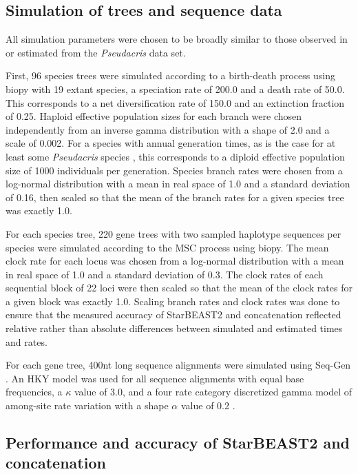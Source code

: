 \documentclass[nogrid]{MBE}%
\begin{document}
\subsection{Simulation of trees and sequence data}

All simulation parameters were chosen to be broadly similar to those observed in
or estimated from the \textit{Pseudacris} data set.

First, 96 species trees were simulated according to a birth-death process
\citep{Gernhard2008769} using biopy with 19 extant species, a speciation rate of
200.0 and a death rate of 50.0. This corresponds to a net diversification rate
of 150.0 and an extinction fraction of 0.25. Haploid effective population sizes
for each branch were chosen independently from an inverse gamma distribution
with a shape of 2.0 and a scale of 0.002. For a species with annual generation
times, as is the case for at least some \textit{Pseudacris} species
\citep{10.2307/1446044}, this corresponds to a diploid effective population size
of 1000 individuals per generation. Species branch rates were chosen from a
log-normal distribution with a mean in real space of 1.0 and a standard
deviation of 0.16, then scaled so that the mean of the branch rates for a given
species tree was exactly 1.0.

For each species tree, 220 gene trees with two sampled haplotype sequences per species
were simulated according to the MSC process using biopy. The
mean clock rate for each locus was chosen from a log-normal distribution with a
mean in real space of 1.0 and a standard deviation of 0.3. The clock rates of
each sequential block of 22 loci were then scaled so that the mean of the clock
rates for a given block was exactly 1.0. Scaling branch rates and clock rates
was done to ensure that the measured accuracy of StarBEAST2 and concatenation reflected
relative rather than absolute differences between simulated and estimated times
and rates.

For each gene tree, 400nt long sequence alignments were simulated using Seq-Gen
\citep{Rambaut01061997}. An HKY model was used for all sequence alignments with
equal base frequencies, a $\kappa$ value of 3.0, and a four rate category discretized gamma model
of among-site rate variation with a shape $\alpha$ value of 0.2
\citep{Yang1994}.

\subsection{Performance and accuracy of StarBEAST2 and concatenation}
\end{document}
